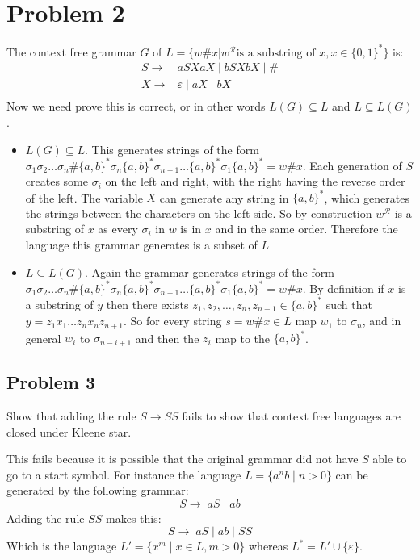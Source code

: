 \documentclass[english]{article}
\begin{document}
\section*{Problem 2}
The context free grammar $G$ of $L = \{ w\#x | w^\mathcal{R} \textrm{is a substring of }x, x \in \{0,1\}^* \}$ is:
\begin{align*}
S \rightarrow & aSXaX \; | \; bSXbX \; | \; \# \\
X \rightarrow & \varepsilon \; | \; aX \; | \; bX \\
\end{align*}
Now we need prove this is correct, or in other words $L(G) \subseteq L$ and $L \subseteq L(G)$.
\begin{itemize}
\item $L(G) \subseteq L$. This generates strings of the form
      $\sigma_1 \sigma_2 \ldots \sigma_n \# \{a,b\}^* \sigma_n \{a,b\}^* \sigma_{n-1} \ldots \{a,b\}^* \sigma_1 \{a,b\}^* = w\#x$.
      Each generation of $S$ creates some $\sigma_i$ on the left and right, with the right having the reverse order of the left.
      The variable $X$ can generate any string in $\{a,b\}^*$, which generates the strings between the characters on the left side.
      So by construction $w^\mathcal{R}$ is a substring of $x$ as every $\sigma_i$ in $w$ is in $x$ and in the same order. Therefore
      the language this grammar generates is a subset of $L$
\item $L \subseteq L(G)$. Again the grammar generates strings of the form 
      $\sigma_1 \sigma_2 \ldots \sigma_n \# \{a,b\}^* \sigma_n \{a,b\}^* \sigma_{n-1} \ldots \{a,b\}^* \sigma_1 \{a,b\}^* = w\#x$.
      By definition if $x$ is a substring of $y$ then there exists $z_1, z_2, \ldots, z_n, z_{n+1} \in \{a,b\}^*$ such that 
      $y = z_1 x_1 \ldots z_n x_n z_{n+1}$. So for every string $s = w\#x \in L$ map $w_1$ to $\sigma_n$, and in general $w_i$ to
      $\sigma_{n-i+1}$ and then the $z_i$ map to the $\{a,b\}^*$. 
\end{itemize}


\subsection*{Problem 3}
Show that adding the rule \(S \rightarrow SS\) fails to show that context free languages are closed under Kleene star.

This fails because it is possible that the original grammar did not have $S$ able to go to a start symbol. For instance
the language \(L = \{ a^n b \mid n > 0 \}\) can be generated by the following grammar:
\[ S \rightarrow \; aS \; | \; ab \]
Adding the rule $SS$ makes this:
\[ S \rightarrow \; aS \; | \; ab \; | \; SS \]
Which is the language \(L' = \{ x^m \mid x \in L, m > 0 \}\) whereas \(L^* = L' \cup \{\varepsilon\}\). 
\end{document}
